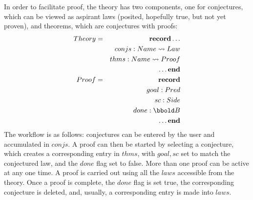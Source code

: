 In order to facilitate proof, the theory has two components, one
for conjectures, which can be viewed as aspirant laws
(posited, hopefully true, but not yet proven),
and theorems, which are conjectures with proofs:
\begin{eqnarray*}
Theory &=& \textbf{record} \ldots
\\ && conjs : Name \pfun Law
\\ && thms : Name \pfun Proof
\\ && \ldots \textbf{end}
\\ Proof &=& \textbf{record}
\\ && goal : Pred
\\ && sc : Side
\\ && done : \Bool
\\ && \ldots \textbf{end}
\end{eqnarray*}
The workflow is as follows: conjectures can be entered by the user
and accumulated in $conjs$. A proof can then be started by selecting
a conjecture, which creates a corresponding entry in $thms$,
with $goal,sc$ set to match the conjectured law, and the $done$ flag
set to false. More than one proof can be active at any one time.
A proof is carried out using all the $laws$ accessible from
the theory.
Once a proof is complete, the $done$ flag is set true,
the corresponding conjecture is deleted, and, usually,
a corresponding entry is made into $laws$.

